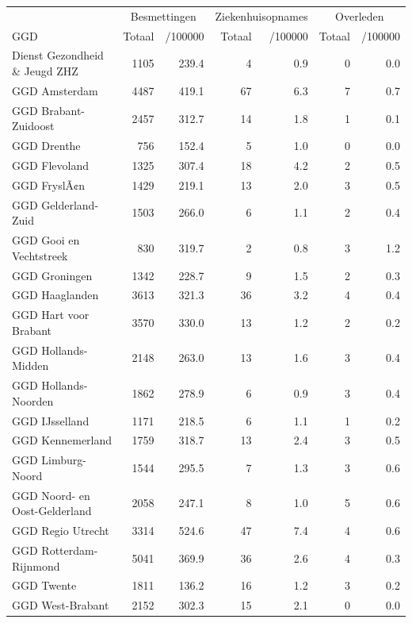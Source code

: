 \documentclass[
  english,
  man,floatsintext]{apa6}
\begin{document}
\begin{table}
\centering\begingroup\fontsize{10}{12}\selectfont

\begin{threeparttable}
\begin{tabular}{lrrrrrr}
\toprule
\multicolumn{1}{c}{ } & \multicolumn{2}{c}{Besmettingen} & \multicolumn{2}{c}{Ziekenhuisopnames} & \multicolumn{2}{c}{Overleden} \\
\cmidrule(l{3pt}r{3pt}){2-3} \cmidrule(l{3pt}r{3pt}){4-5} \cmidrule(l{3pt}r{3pt}){6-7}
GGD & Totaal & /100000 & Totaal & /100000 & Totaal & /100000\\
\midrule
Dienst Gezondheid \& Jeugd ZHZ & 1105 & 239.4 & 4 & 0.9 & 0 & 0.0\\
GGD Amsterdam & 4487 & 419.1 & 67 & 6.3 & 7 & 0.7\\
GGD Brabant-Zuidoost & 2457 & 312.7 & 14 & 1.8 & 1 & 0.1\\
GGD Drenthe & 756 & 152.4 & 5 & 1.0 & 0 & 0.0\\
GGD Flevoland & 1325 & 307.4 & 18 & 4.2 & 2 & 0.5\\
GGD FryslÃ¢n & 1429 & 219.1 & 13 & 2.0 & 3 & 0.5\\
GGD Gelderland-Zuid & 1503 & 266.0 & 6 & 1.1 & 2 & 0.4\\
GGD Gooi en Vechtstreek & 830 & 319.7 & 2 & 0.8 & 3 & 1.2\\
GGD Groningen & 1342 & 228.7 & 9 & 1.5 & 2 & 0.3\\
GGD Haaglanden & 3613 & 321.3 & 36 & 3.2 & 4 & 0.4\\
GGD Hart voor Brabant & 3570 & 330.0 & 13 & 1.2 & 2 & 0.2\\
GGD Hollands-Midden & 2148 & 263.0 & 13 & 1.6 & 3 & 0.4\\
GGD Hollands-Noorden & 1862 & 278.9 & 6 & 0.9 & 3 & 0.4\\
GGD IJsselland & 1171 & 218.5 & 6 & 1.1 & 1 & 0.2\\
GGD Kennemerland & 1759 & 318.7 & 13 & 2.4 & 3 & 0.5\\
GGD Limburg-Noord & 1544 & 295.5 & 7 & 1.3 & 3 & 0.6\\
GGD Noord- en Oost-Gelderland & 2058 & 247.1 & 8 & 1.0 & 5 & 0.6\\
GGD Regio Utrecht & 3314 & 524.6 & 47 & 7.4 & 4 & 0.6\\
GGD Rotterdam-Rijnmond & 5041 & 369.9 & 36 & 2.6 & 4 & 0.3\\
GGD Twente & 1811 & 136.2 & 16 & 1.2 & 3 & 0.2\\
GGD West-Brabant & 2152 & 302.3 & 15 & 2.1 & 0 & 0.0\\

\end{tabular}
\end{threeparttable}
\end{table}
\end{document}
